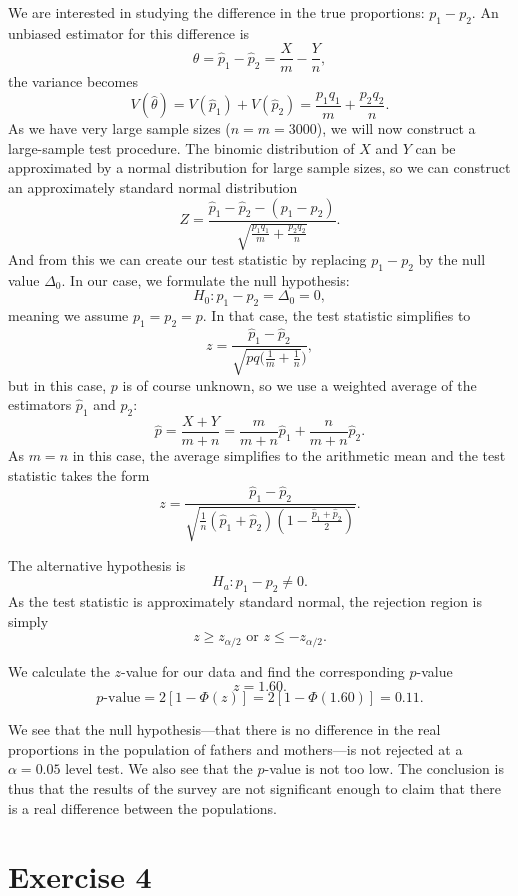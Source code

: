 \documentclass[a4paper, 11pt, titlepage]{article}
\begin{document}
We are interested in studying the difference in the true proportions: $p_1 -p_2$. An unbiased estimator for this difference is
$$\hat{\theta} = \hat{p}_1 - \hat{p}_2 = \frac{X}{m} - \frac{Y}{n},$$
the variance becomes
$$V(\hat{\theta}) = V(\hat{p}_1) + V(\hat{p}_2) = \frac{p_1q_1}{m} + \frac{p_2q_2}{n}.$$
As we have very large sample sizes ($n=m=3000$), we will now construct a large-sample test procedure. The binomic distribution of $X$ and $Y$ can be approximated by a normal distribution for large sample sizes, so we can construct an approximately standard normal distribution
$$Z = \frac{\hat{p}_1 - \hat{p}_2 - (p_1 - p_2)}{\sqrt{\frac{p_1q_1}{m} + \frac{p_2q_2}{n}}}.$$
And from this we can create our test statistic by replacing $p_1 - p_2$ by the null value $\Delta_0$. In our case, we formulate the null hypothesis: 
$$H_0: p_1 - p_2 = \Delta_0 = 0,$$
meaning we assume $p_1 = p_2 = p$. In that case, the test statistic simplifies to
$$z = \frac{\hat{p}_1 - \hat{p}_2}{\sqrt{pq\bigg(\frac{1}{m} + \frac{1}{n}}\bigg)},$$
but in this case, $p$ is of course unknown, so we use a weighted average of the estimators $\hat{p}_1$ and $\hat{p}_2$:
$$\hat{p} = \frac{X + Y}{m + n} = \frac{m}{m+n}\hat{p}_1 + \frac{n}{m+n}\hat{p}_2.$$
As $m=n$ in this case, the average simplifies to the arithmetic mean and the test statistic takes the form
$$z = \frac{\hat{p}_1 - \hat{p}_2}{\sqrt{\frac{1}{n}(\hat{p}_1 + \hat{p}_2)(1 - \frac{\hat{p}_1 + \hat{p}_2}{2})}}.$$

The alternative hypothesis is
$$H_a: p_1 - p_2 \neq 0.$$
As the test statistic is approximately standard normal, the rejection region is simply
$$z \geq z_{\alpha/2} \mbox{  or  } z \leq -z_{\alpha/2}.$$

We calculate the $z$-value for our data and find the corresponding $p$-value
$$z = 1.60.$$
$$p\mbox{-value} = 2[1-\Phi(z)] = 2[1-\Phi(1.60)] = 0.11.$$

We see that the null hypothesis---that there is no difference in the real proportions in the population of fathers and mothers---is not rejected at a $\alpha=0.05$ level test. We also see that the $p$-value is not too low. The conclusion is thus that the results of the survey are not significant enough to claim that there is a real difference between the populations.

\clearpage

\section*{Exercise 4}
\end{document}

